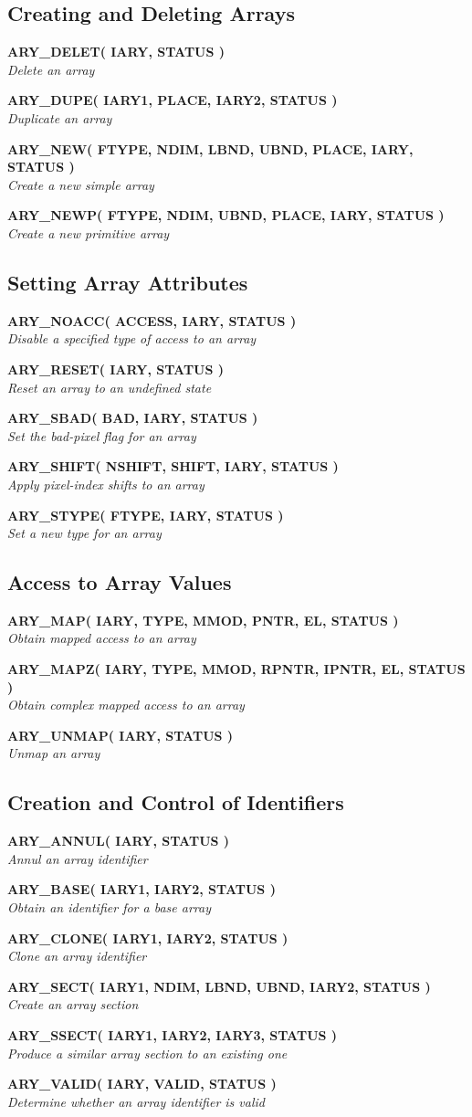 \documentclass[twoside,11pt]{article}
\newcommand{\xlabel}[1]{}
\newcommand{\noteroutine}[2]{\textbf{#1}\hspace*{\fill}\nopagebreak \\
                             \hspace*{3em}\emph{#2}\hspace*{\fill}\par}
\begin{document}
\subsection{\xlabel{creating_and_deleting_arrays}Creating and Deleting Arrays}
\label{creating_and_deleting_arrays}

\noteroutine{ARY\_DELET( IARY, STATUS )}
            {Delete an array}
\noteroutine{ARY\_DUPE( IARY1, PLACE, IARY2, STATUS )}
            {Duplicate an array}
\noteroutine{ARY\_NEW( FTYPE, NDIM, LBND, UBND, PLACE, IARY, STATUS )}
            {Create a new simple array}
\noteroutine{ARY\_NEWP( FTYPE, NDIM, UBND, PLACE, IARY, STATUS )}
            {Create a new primitive array}


\subsection{\xlabel{setting_array_attributes}Setting Array Attributes}
\label{setting_array_attributes}

\noteroutine{ARY\_NOACC( ACCESS, IARY, STATUS )}
            {Disable a specified type of access to an array}
\noteroutine{ARY\_RESET( IARY, STATUS )}
            {Reset an array to an undefined state}
\noteroutine{ARY\_SBAD( BAD, IARY, STATUS )}
            {Set the bad-pixel flag for an array}
\noteroutine{ARY\_SHIFT( NSHIFT, SHIFT, IARY, STATUS )}
            {Apply pixel-index shifts to an array}
\noteroutine{ARY\_STYPE( FTYPE, IARY, STATUS )}
            {Set a new type for an array}


\subsection{\xlabel{access_to_array_values}Access to Array Values}
\label{access_to_array_values}

\noteroutine{ARY\_MAP( IARY, TYPE, MMOD, PNTR, EL, STATUS )}
            {Obtain mapped access to an array}
\noteroutine{ARY\_MAPZ( IARY, TYPE, MMOD, RPNTR, IPNTR, EL, STATUS )}
            {Obtain complex mapped access to an array}
\noteroutine{ARY\_UNMAP( IARY, STATUS )}
            {Unmap an array}


\subsection{\xlabel{creation_and_control_of_identifiers}%
Creation and Control of Identifiers}
\label{creation_and_control_of_identifiers}

\noteroutine{ARY\_ANNUL( IARY, STATUS )}
            {Annul an array identifier}
\noteroutine{ARY\_BASE( IARY1, IARY2, STATUS )}
            {Obtain an identifier for a base array}
\noteroutine{ARY\_CLONE( IARY1, IARY2, STATUS )}
            {Clone an array identifier}
\noteroutine{ARY\_SECT( IARY1, NDIM, LBND, UBND, IARY2, STATUS )}
            {Create an array section}
\noteroutine{ARY\_SSECT( IARY1, IARY2, IARY3, STATUS )}
            {Produce a similar array section to an existing one}
\noteroutine{ARY\_VALID( IARY, VALID, STATUS )}
            {Determine whether an array identifier is valid}
\end{document}

